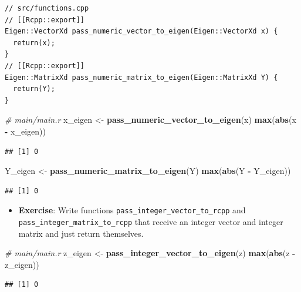 \documentclass[]{book}
\newenvironment{Shaded}{\begin{snugshade}}{\end{snugshade}}
\newcommand{\KeywordTok}[1]{\textcolor[rgb]{0.13,0.29,0.53}{\textbf{#1}}}
\newcommand{\StringTok}[1]{\textcolor[rgb]{0.31,0.60,0.02}{#1}}
\newcommand{\CommentTok}[1]{\textcolor[rgb]{0.56,0.35,0.01}{\textit{#1}}}
\newcommand{\OperatorTok}[1]{\textcolor[rgb]{0.81,0.36,0.00}{\textbf{#1}}}
\newcommand{\NormalTok}[1]{#1}
\providecommand{\tightlist}{%
  \setlength{\itemsep}{0pt}\setlength{\parskip}{0pt}}
\begin{document}
\begin{verbatim}
// src/functions.cpp
// [[Rcpp::export]]
Eigen::VectorXd pass_numeric_vector_to_eigen(Eigen::VectorXd x) {
  return(x);
}
// [[Rcpp::export]]
Eigen::MatrixXd pass_numeric_matrix_to_eigen(Eigen::MatrixXd Y) {
  return(Y);
}
\end{verbatim}

\begin{Shaded}
\begin{Highlighting}[]
\CommentTok{# main/main.r}
\NormalTok{x_eigen <-}\StringTok{ }\KeywordTok{pass_numeric_vector_to_eigen}\NormalTok{(x)}
\KeywordTok{max}\NormalTok{(}\KeywordTok{abs}\NormalTok{(x }\OperatorTok{-}\StringTok{ }\NormalTok{x_eigen))}
\end{Highlighting}
\end{Shaded}

\begin{verbatim}
## [1] 0
\end{verbatim}

\begin{Shaded}
\begin{Highlighting}[]
\NormalTok{Y_eigen <-}\StringTok{ }\KeywordTok{pass_numeric_matrix_to_eigen}\NormalTok{(Y)}
\KeywordTok{max}\NormalTok{(}\KeywordTok{abs}\NormalTok{(Y }\OperatorTok{-}\StringTok{ }\NormalTok{Y_eigen))}
\end{Highlighting}
\end{Shaded}

\begin{verbatim}
## [1] 0
\end{verbatim}

\begin{itemize}
\tightlist
\item
  \textbf{Exercise}: Write functions
  \texttt{pass\_integer\_vector\_to\_rcpp} and
  \texttt{pass\_integer\_matrix\_to\_rcpp} that receive an integer
  vector and integer matrix and just return themselves.
\end{itemize}

\begin{Shaded}
\begin{Highlighting}[]
\CommentTok{# main/main.r}
\NormalTok{z_eigen <-}\StringTok{ }\KeywordTok{pass_integer_vector_to_eigen}\NormalTok{(z)}
\KeywordTok{max}\NormalTok{(}\KeywordTok{abs}\NormalTok{(z }\OperatorTok{-}\StringTok{ }\NormalTok{z_eigen))}
\end{Highlighting}
\end{Shaded}

\begin{verbatim}
## [1] 0
\end{verbatim}
\end{document}
